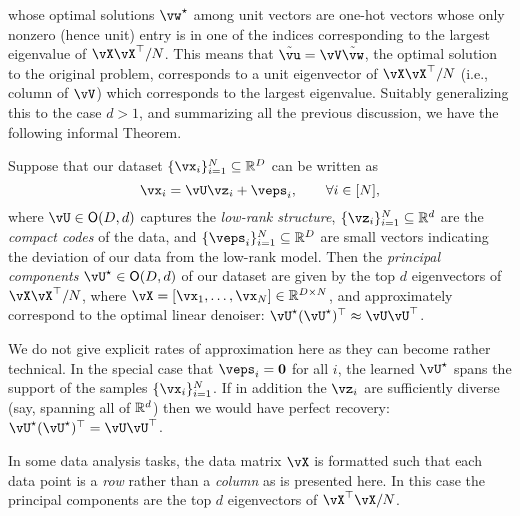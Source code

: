 \documentclass[../../book-main.tex]{subfiles}
\begin{document}
whose optimal solutions \(\vw^{\star}\) among unit vectors are one-hot vectors whose only nonzero (hence unit) entry is in one of the indices corresponding to the largest eigenvalue of \(\vX\vX^{\top}/N\). This means that \(\tilde{\vu} = \vV\tilde{\vw}\), the optimal solution to the original problem, corresponds to a unit eigenvector of \(\vX\vX^{\top}/N\) (i.e., column of \(\vV\)) which corresponds to the largest eigenvalue.  Suitably generalizing this to the case \(d > 1\), and summarizing all the previous discussion, we have the following informal Theorem.
\begin{theorem}\label{thm:pca}
    Suppose that our dataset \(\{\vx_{i}\}_{i = 1}^{N} \subseteq \R^{D}\) can be written as 
    \begin{equation}
        \vx_{i} = \vU\vz_{i} + \veps_{i}, \qquad \forall i \in [N],
    \end{equation}
    where \(\vU \in \O(D, d)\) captures the \textit{low-rank structure},
    \(\{\vz_{i}\}_{i = 1}^{N} \subseteq \R^{d}\) are the \textit{compact codes}
    of the data, and \(\{\veps_{i}\}_{i = 1}^{N} \subseteq \R^{D}\) are small
    vectors indicating the deviation of our data from the low-rank model. Then
    the \textit{principal components} \(\vU^{\star} \in \O(D, d)\) of our
    dataset are given by the top \(d\) eigenvectors of \(\vX\vX^{\top}/N\),
    where \(\vX = [\vx_{1}, \dots, \vx_{N}] \in \R^{D \times N}\), and
    approximately correspond to the optimal linear denoiser:
    \(\vU^{\star}(\vU^{\star})^{\top} \approx \vU\vU^{\top}\).
\end{theorem}
We do not give explicit rates of approximation here as they can become rather
technical. In the special case that \(\veps_{i} = \vzero\) for all \(i\), the
learned \(\vU^{\star}\) spans the support of the samples \(\{\vx_{i}\}_{i
= 1}^{N}\). If in addition the \(\vz_{i}\) are sufficiently diverse (say,
spanning all of \(\mathbb{R}^{d}\)) then we would have perfect recovery:
\(\vU^{\star}(\vU^{\star})^{\top} = \vU\vU^{\top}\).


\begin{remark}
    In some data analysis tasks, the data matrix \(\vX\) is formatted such that each data point is a \textit{row} rather than a \textit{column} as is presented here. In this case the principal components are the top \(d\) eigenvectors of \(\vX^{\top}\vX/N\).
\end{remark}
\end{document}
